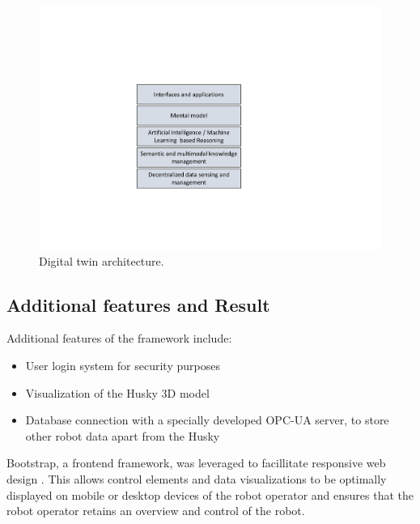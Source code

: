 \documentclass[letterpaper, 10 pt, conference]{ieeeconf}  %
\begin{document}
\begin{figure}[b]
	\centerline{\includegraphics[width=0.5\columnwidth]{images/DT.pdf}}
	\caption{Digital twin architecture.}
	\label{fig:DT}
\end{figure}



\subsection{Additional features and Result}
Additional features of the framework include: 
\begin{itemize}
\item User login system for security purposes
\item Visualization of the Husky 3D model 
\item Database connection with a specially developed OPC-UA server, to store other robot data apart from the Husky
\end{itemize}
Bootstrap, a frontend framework, was leveraged to facillitate responsive web design \cite{bootstrap}. 
This allows control elements and data visualizations to be optimally displayed on mobile or desktop devices of the robot operator and ensures that the robot operator retains an overview and control of the robot.
\end{document}
